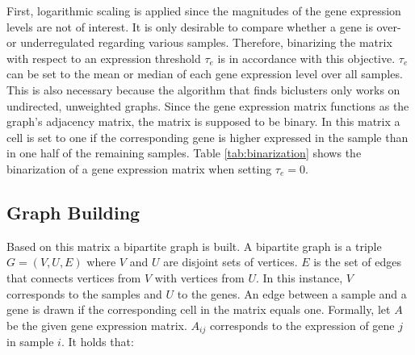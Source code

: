 \documentclass[10pt, conference, compsocconf]{IEEEtran}
\begin{document}
First, logarithmic scaling is applied since the magnitudes of the gene expression levels are not of interest.
It is only desirable to compare whether a gene is over- or underregulated regarding various samples.
Therefore, binarizing the matrix with respect to an expression threshold $\tau_e$ is in accordance with this objective.
$\tau_e$ can be set to the mean or median of each gene expression level over all samples.
This is also necessary because the algorithm that finds biclusters only works on undirected, unweighted graphs.
Since the gene expression matrix functions as the graph's adjacency matrix, the matrix is supposed to be binary.
In this matrix a cell is set to one if the corresponding gene is higher expressed in the sample than in one half of the remaining samples.
Table \ref{tab:binarization} shows the binarization of a gene expression matrix when setting $\tau_e=0$.
\subsection{Graph Building}
Based on this matrix a bipartite graph is built.
A bipartite graph is a triple $G=(V, U, E)$ where $V$ and $U$ are disjoint sets of vertices.
$E$ is the set of edges that connects vertices from $V$ with vertices from $U$.
In this instance, $V$ corresponds to the samples and $U$ to the genes.
An edge between a sample and a gene is drawn if the corresponding cell in the matrix equals one.
Formally, let $A$ be the given gene expression matrix.
$A_{ij}$ corresponds to the expression of gene $j$ in sample $i$.
It holds that:
\end{document}

